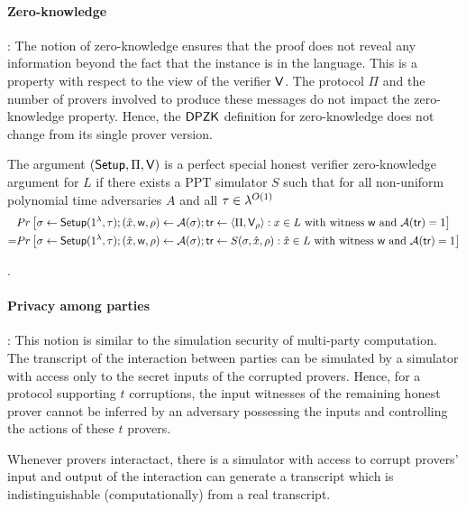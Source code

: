 \paragraph{Zero-knowledge}: 
The notion of zero-knowledge ensures that the proof does not reveal any information beyond the fact that the instance is in the language.
This is a property with respect to the view of the verifier $\mathsf{V}$. The protocol $\Pi$ and the number of provers involved to produce these messages do not impact the zero-knowledge property. Hence, the $\mathsf{DPZK}$ definition for zero-knowledge does not change from its single prover version.
\begin{definition}
The argument $(\mathsf{Setup}, \Pi, \mathsf{V})$ is a perfect special honest verifier zero-knowledge argument for $L$ if there exists a PPT simulator $S$ such that for all non-uniform polynomial time adversaries $A$ and all $\tau \in {\lambda}^{O(1)}$ 
\begin{align*}
&Pr \left[ \sigma \leftarrow \mathsf{Setup}(1^{\lambda}, \tau); (\hat{x} ,\mathsf{w} ,\rho) \leftarrow \mathcal{A}(\sigma); \mathsf{tr} \leftarrow \langle \Pi, \mathsf{V}_\rho \rangle: x \in L \text{ with witness } \mathsf{w} \text{ and } \mathcal{A}(\mathsf{tr})=1 \right] \\
= &Pr \left[\sigma \leftarrow \mathsf{Setup}(1^{\lambda}, \tau); (\hat{x},\mathsf{w},\rho) \leftarrow \mathcal{A}(\sigma); \mathsf{tr} \leftarrow S(\sigma,\hat{x},\rho): \hat{x} \in L \text{ with witness } \mathsf{w} \text{ and } \mathcal{A}(\mathsf{tr}) = 1 \right]
\end{align*}
\end{definition}
.

\paragraph{Privacy among parties}:
This notion is similar to the simulation security of multi-party computation. The transcript of the interaction between parties can be simulated by a simulator with access only to the secret inputs of the corrupted provers. Hence, for a protocol supporting $t$ corruptions, the input witnesses of the remaining honest prover cannot be inferred by an adversary possessing the inputs and controlling the actions of these $t$ provers.

Whenever provers interactact, there is a simulator with access to corrupt provers' input and output of the interaction can generate a transcript which is indistinguishable (computationally) from a real transcript. 

